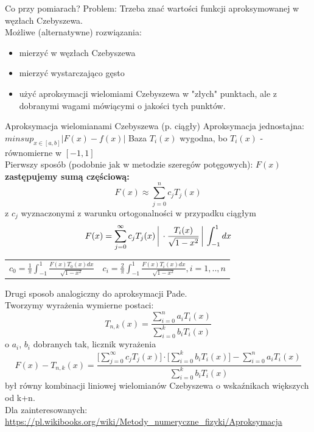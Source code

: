 \begin{frame}{Co przy pomiarach?}
     Problem:  Trzeba znać wartości funkcji aproksymowanej w węzłach Czebyszewa.\\
Możliwe (alternatywne) rozwiązania:
\begin{itemize}
    \item mierzyć w węzłach Czebyszewa
    \item     mierzyć wystarczająco  gęsto
    \item użyć aproksymacji wielomiami Czebyszewa w "złych" punktach, ale z dobranymi wagami mówiącymi o jakości tych punktów. 
\end{itemize}
\end{frame}
\begin{frame}{Aproksymacja wielomianami Czebyszewa (p. ciągły)}
    Aproksymacja jednostajna: $minsup_{x \in [a,b]}|F(x)-f(x)|$ \newline
    Baza $T_i(x)$ wygodna, bo $T_i(x)$ - równomierne w $[-1,1]$ \\
    \vspace{0.5cm}
    Pierwszy sposób (podobnie jak w metodzie  szeregów potęgowych):
    $F(x)$ \textbf{zastępujemy sumą częściową:}
    $$F(x) \approx \sum_{j=0}^{n}c_jT_j(x)$$
    z $c_j$ wyznaczonymi z warunku ortogonalności w przypadku ciągłym
    $$F(x) = \sum_{j=0}^{\infty}c_jT_j(x)    \bigg\arrowvert \cdot\frac{T_i(x)}{\sqrt{1-x^2}}  \bigg\arrowvert \int_{-1}^{1}dx$$
    \begin{tabular}{ll}
        $c_0 = \frac{1}{\pi}\int_{-1}^{1}\frac{F(x)T_0(x)dx}{\sqrt{1-x^2}}$ &
        $c_i = \frac{2}{\pi}\int_{-1}^{1}\frac{F(x)T_i(x)dx}{\sqrt{1-x^2}}, i=1,..,n$
    \end{tabular}

\end{frame}
\begin{frame}
    Drugi sposob analogiczny do aproksymacji Pade.\\ Tworzymy wyrażenia wymierne postaci:
    $$T_{n,k}(x) = \frac{\sum_{i=0}^{n}a_iT_i(x)}{\sum_{i=0}^{k}b_iT_i(x)}$$
    o $a_i$, $b_i$ dobranych tak, licznik wyrażenia  
     $$F(x)-T_{n,k}(x) = \frac{\big[\sum_{j=0}^{\infty}c_jT_j(x)\big] \cdot \big[\sum_{i=0}^{k}b_iT_i(x)\big] - \sum_{i=0}^{n}a_iT_i(x)}{\sum_{i=0}^{k}b_iT_i(x)}$$
     był równy  kombinacji liniowej wielomianów Czebyszewa o wskaźnikach większych od k+n. \\
     
     Dla zainteresowanych:
    \url{https://pl.wikibooks.org/wiki/Metody_numeryczne_fizyki/Aproksymacja}
\end{frame}
